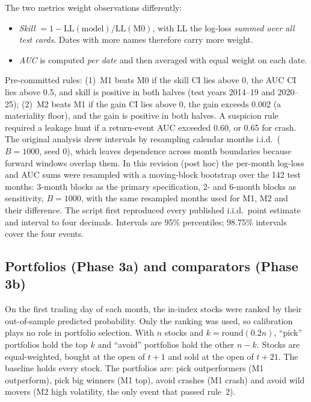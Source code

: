\documentclass[11pt]{article}
\begin{document}
The two metrics weight observations differently:
\begin{itemize}
\item \emph{Skill} $=1-\mathrm{LL}(\text{model})/\mathrm{LL}(\text{M0})$, with LL the log-loss \emph{summed over all test cards}. Dates with more names therefore carry more weight.
\item \emph{AUC} is computed \emph{per date} and then averaged with equal weight on each date.
\end{itemize}
Pre-committed rules: (1)~M1 beats M0 if the skill CI lies above 0, the AUC CI lies above 0.5, and skill is positive in both halves (test years 2014--19 and 2020--25); (2)~M2 beats M1 if the gain CI lies above 0, the gain exceeds 0.002 (a materiality floor), and the gain is positive in both halves. A suspicion rule required a leakage hunt if a return-event AUC exceeded 0.60, or 0.65 for crash. The original analysis drew intervals by resampling calendar months i.i.d.\ ($B=1000$, seed 0), which leaves dependence across month boundaries because forward windows overlap them. In this revision (post hoc) the per-month log-loss and AUC sums were resampled with a moving-block bootstrap over the 142 test months: 3-month blocks as the primary specification, 2- and 6-month blocks as sensitivity, $B=1000$, with the same resampled months used for M1, M2 and their difference. The script first reproduced every published i.i.d.\ point estimate and interval to four decimals. Intervals are 95\% percentiles; 98.75\% intervals cover the four events.

\subsection{Portfolios (Phase 3a) and comparators (Phase 3b)}
On the first trading day of each month, the in-index stocks were ranked by their out-of-sample predicted probability. Only the ranking was used, so calibration plays no role in portfolio selection. With $n$ stocks and $k=\mathrm{round}(0.2n)$, ``pick'' portfolios hold the top $k$ and ``avoid'' portfolios hold the other $n-k$. Stocks are equal-weighted, bought at the open of $t+1$ and sold at the open of $t+21$. The baseline holds every stock. The portfolios are: pick outperformers (M1 outperform), pick big winners (M1 top), avoid crashes (M1 crash) and avoid wild movers (M2 high volatility, the only event that passed rule~2).
\end{document}
